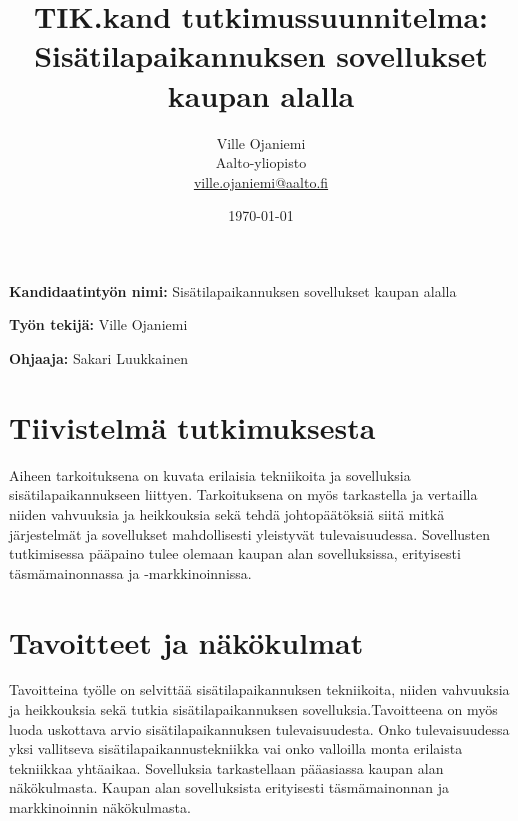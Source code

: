 \documentclass[12pt,a4paper,finnish,oneside]{article}
\begin{document}

\title{TIK.kand tutkimussuunnitelma:\\[5mm]
Sisätilapaikannuksen
sovellukset kaupan alalla}

\author{Ville Ojaniemi\\
Aalto-yliopisto\\
\url{ville.ojaniemi@aalto.fi}}

\date{\today}

\maketitle


\vspace{10mm}

%

\textbf{Kandidaatintyön nimi:} Sisätilapaikannuksen sovellukset kaupan alalla

\textbf{Työn tekijä:} Ville Ojaniemi

\textbf{Ohjaaja:} Sakari Luukkainen


\section{Tiivistelmä tutkimuksesta}

 Aiheen tarkoituksena on kuvata erilaisia tekniikoita ja sovelluksia sisätilapaikannukseen liittyen. Tarkoituksena on myös tarkastella ja vertailla niiden vahvuuksia ja heikkouksia sekä tehdä johtopäätöksiä siitä mitkä järjestelmät ja sovellukset mahdollisesti yleistyvät tulevaisuudessa. Sovellusten tutkimisessa pääpaino tulee olemaan kaupan alan sovelluksissa, erityisesti täsmämainonnassa ja -markkinoinnissa.

\section{Tavoitteet ja näkökulmat}

Tavoitteina työlle on selvittää sisätilapaikannuksen tekniikoita, niiden vahvuuksia ja heikkouksia sekä tutkia sisätilapaikannuksen sovelluksia.Tavoitteena on myös luoda uskottava arvio sisätilapaikannuksen tulevaisuudesta. Onko tulevaisuudessa yksi vallitseva sisätilapaikannustekniikka vai onko valloilla monta erilaista tekniikkaa yhtäaikaa. Sovelluksia tarkastellaan pääasiassa kaupan alan näkökulmasta. Kaupan alan sovelluksista erityisesti täsmämainonnan ja markkinoinnin näkökulmasta.
\end{document}
